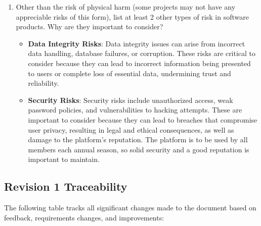 \documentclass{article}
\begin{document}
\begin{enumerate}
    \item Other than the risk of physical harm (some projects may not have any
          appreciable risks of this form), list at least 2 other types of risk in
          software products. Why are they important to consider?

          \begin{itemize}
              \item \textbf{Data Integrity Risks}: Data integrity issues can arise from incorrect data handling, database failures, or corruption. These risks are critical to consider because they can lead to incorrect information being presented to users or complete loss of essential data, undermining trust and reliability.
              \item \textbf{Security Risks}: Security risks include unauthorized access, weak password policies, and vulnerabilities to hacking attempts. These are important to consider because they can lead to breaches that compromise user privacy, resulting in legal and ethical consequences, as well as damage to the platform's reputation. The platform is to be used by all members each annual season, so solid security and a good reputation is important to maintain.
          \end{itemize}

\end{enumerate}

\subsection{Revision 1 Traceability}
The following table tracks all significant changes made to the document based on feedback, requirements changes, and improvements:

\newcommand{\issueLink}[1]{\href{https://github.com/dcheung11/team-6-capstone-project/issues/#1}{Issue #1}}
\end{document}
